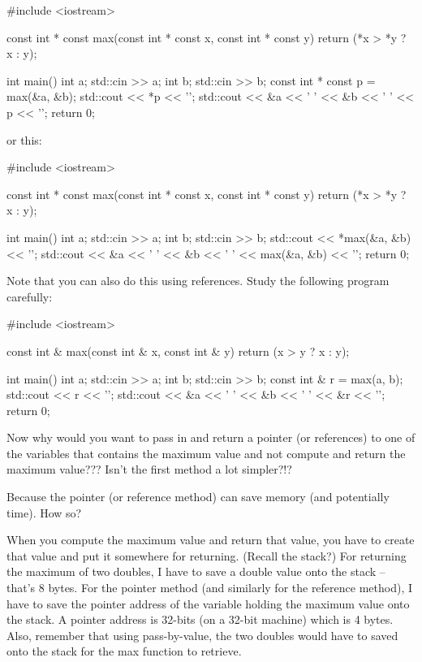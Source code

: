 \begin{consolethree}[escapeinside=||]
#include <iostream>

const int * const max(const int * const x,
                      const int * const y)
{
    return (*x > *y ? x : y);
}

int main()
{
    int a;
    std::cin >> a;
    int b;
    std::cin >> b;
    const int * const p = max(&a, &b);
    std::cout << *p << '\n';
    std::cout << &a << ' ' << &b << ' '
              << p << '\n';
    return 0;
}
\end{consolethree}
or this:

\begin{consolethree}[escapeinside=||]
#include <iostream>

const int * const max(const int * const x,
                      const int * const y)
{
    return (*x > *y ? x : y);
}

int main()
{
    int a;
    std::cin >> a;
    int b;
    std::cin >> b;
    std::cout << *max(&a, &b) << '\n';
    std::cout << &a << ' ' << &b << ' '
                    << max(&a, &b) << '\n';
    return 0;
}
\end{consolethree}
Note that you can also do this using references. Study the following program carefully:

\begin{consolethree}[escapeinside=||]
#include <iostream>

const int & max(const int & x, const int & y)
{
    return (x > y ? x : y);
}

int main()
{
    int a;
    std::cin >> a;
    int b;
    std::cin >> b;
    const int & r = max(a, b);
    std::cout << r << '\n';
    std::cout << &a << ' ' << &b
                    << ' ' << &r << '\n';
    return 0;
}
\end{consolethree}
Now why would you want to pass in and return a pointer (or references) to one of the variables that contains the maximum value and not compute and return the maximum value??? Isn't the first method a lot simpler?!?

Because the pointer (or reference method) can save memory (and potentially time). How so?

When you compute the maximum value and return that value, you have to create that value and put it somewhere for returning. (Recall the stack?) For returning the maximum of two doubles, I have to save a double value onto the stack -- that's 8 bytes. For the pointer method (and similarly for the reference method), I have to save the pointer address of the variable holding the maximum value onto the stack. A pointer address is 32-bits (on a 32-bit machine) which is 4 bytes. Also, remember that using pass-by-value, the two doubles would have to saved onto the stack for the max function to retrieve.

